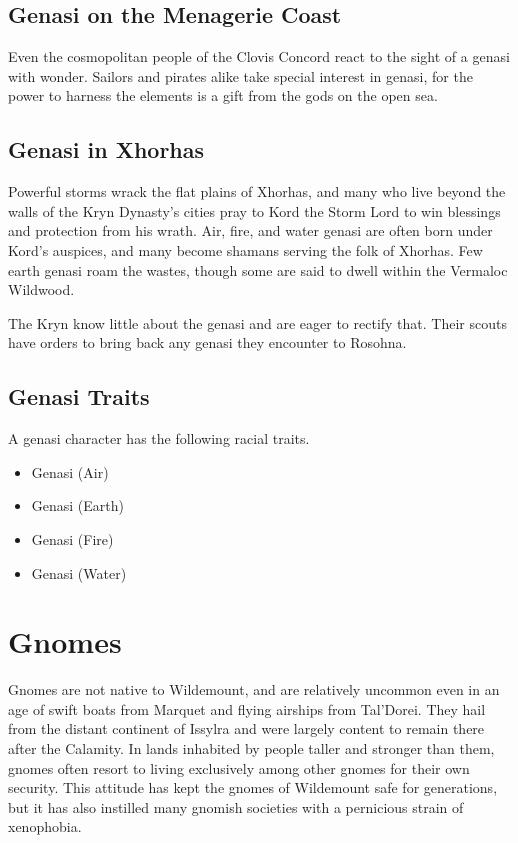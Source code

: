 \documentclass[10pt,a4paper,twoside,bg=print,twocolumn,openany,nodeprecatedcode]{dndbook}
\begin{document}
\subsection{Genasi on the Menagerie Coast}
Even the cosmopolitan people of the Clovis Concord react to the sight of a genasi with wonder. Sailors and pirates alike take special interest in genasi, for the power to harness the elements is a gift from the gods on the open sea.

\subsection{Genasi in Xhorhas}
Powerful storms wrack the flat plains of Xhorhas, and many who live beyond the walls of the Kryn Dynasty's cities pray to Kord the Storm Lord to win blessings and protection from his wrath. Air, fire, and water genasi are often born under Kord's auspices, and many become shamans serving the folk of Xhorhas. Few earth genasi roam the wastes, though some are said to dwell within the Vermaloc Wildwood.

The Kryn know little about the genasi and are eager to rectify that. Their scouts have orders to bring back any genasi they encounter to Rosohna.

\subsection{Genasi Traits}
A genasi character has the following racial traits.


\begin{itemize}
\item Genasi (Air)
\item Genasi (Earth)
\item Genasi (Fire)
\item Genasi (Water)
\end{itemize}

\section{Gnomes}
Gnomes are not native to Wildemount, and are relatively uncommon even in an age of swift boats from Marquet and flying airships from Tal'Dorei. They hail from the distant continent of Issylra and were largely content to remain there after the Calamity. In lands inhabited by people taller and stronger than them, gnomes often resort to living exclusively among other gnomes for their own security. This attitude has kept the gnomes of Wildemount safe for generations, but it has also instilled many gnomish societies with a pernicious strain of xenophobia.
\end{document}
